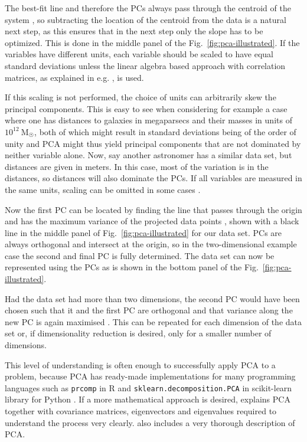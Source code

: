 \documentclass[english, oneside]{HYgradu}
\begin{document}
The best-fit line and therefore the PCs always pass through the centroid of the system \citep{pearson1901lines}, so subtracting the location of the centroid from the data is a natural next step, as this ensures that in the next step only the slope has to be optimized. This is done in the middle panel of the Fig.\ \ref{fig:pca-illustrated}. If the variables have different units, each variable should be scaled to have equal standard deviations \citep{james2013introduction} unless the linear algebra based approach with correlation matrices, as explained in e.g. \citep{jolliffe2002principal}, is used.

If this scaling is not performed, the choice of units can arbitrarily skew the principal components. This is easy to see when considering for example a case where one has distances to galaxies in megaparsecs and their masses in units of $10^{12}\ \mathrm{M_{\astrosun}}$, both of which might result in standard deviations being of the order of unity and PCA might thus yield principal components that are not dominated by neither variable alone. Now, say another astronomer has a similar data set, but distances are given in meters. In this case, most of the variation is in the distances, so distances will also dominate the PCs. If all variables are measured in the same units, scaling can be omitted in some cases \citep{james2013introduction}.

Now the first PC can be located by finding the line that passes through the origin and has the maximum variance of the projected data points \citep{jolliffe2002principal}, shown with a black line in the middle panel of Fig.\ \ref{fig:pca-illustrated} for our data set. PCs are always orthogonal and intersect at the origin, so in the two-dimensional example case the second and final PC is fully determined. The data set can now be represented using the PCs as is shown in the bottom panel of the Fig.\ \ref{fig:pca-illustrated}.

Had the data set had more than two dimensions, the second PC would have been chosen such that it and the first PC are orthogonal and that variance along the new PC is again maximised \citep{jolliffe2002principal}. This can be repeated for each dimension of the data set or, if dimensionality reduction is desired, only for a smaller number of dimensions.

This level of understanding is often enough to successfully apply PCA to a problem, because PCA has ready-made implementations for many programming languages such as \texttt{prcomp} in R \citep{james2013introduction} and \texttt{sklearn.decomposition.PCA} in scikit-learn library  for Python \citep{scikit-learn}. If a more mathematical approach is desired, \citet{smith2002tutorial} explains PCA together with covariance matrices, eigenvectors and eigenvalues required to understand the process very clearly. \citet{jolliffe2002principal} also includes a very thorough description of PCA.
\end{document}
